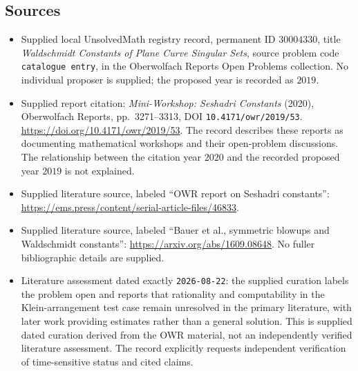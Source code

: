\documentclass[11pt]{article}
\begin{document}
\subsection{Sources}
\begin{itemize}
\item Supplied local UnsolvedMath registry record, permanent ID \(30004330\), title \emph{Waldschmidt Constants of Plane Curve Singular Sets}, source problem code \texttt{catalogue entry}, in the Oberwolfach Reports Open Problems collection. No individual proposer is supplied; the proposed year is recorded as \(2019\).
\item Supplied report citation: \emph{Mini-Workshop: Seshadri Constants} (2020), Oberwolfach Reports, pp.\ 3271--3313, DOI \texttt{10.4171/owr/2019/53}. \url{https://doi.org/10.4171/owr/2019/53}. The record describes these reports as documenting mathematical workshops and their open-problem discussions. The relationship between the citation year \(2020\) and the recorded proposed year \(2019\) is not explained.
\item Supplied literature source, labeled ``OWR report on Seshadri constants'': \url{https://ems.press/content/serial-article-files/46833}.
\item Supplied literature source, labeled ``Bauer et al., symmetric blowups and Waldschmidt constants'': \url{https://arxiv.org/abs/1609.08648}. No fuller bibliographic details are supplied.
\item Literature assessment dated exactly \texttt{2026-08-22}: the supplied curation labels the problem open and reports that rationality and computability in the Klein-arrangement test case remain unresolved in the primary literature, with later work providing estimates rather than a general solution. This is supplied dated curation derived from the OWR material, not an independently verified literature assessment. The record explicitly requests independent verification of time-sensitive status and cited claims.
\end{itemize}
\end{document}
